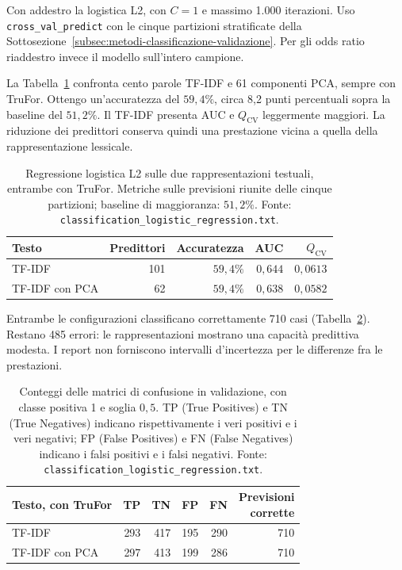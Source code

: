 Con  addestro la logistica L2, con $C=1$ e massimo 1.000 iterazioni. Uso \texttt{cross\_val\_predict} con le cinque partizioni stratificate della Sottosezione~\ref{subsec:metodi-classificazione-validazione}. Per gli odds ratio riaddestro invece il modello sull'intero campione.

La Tabella~\ref{tab:risultati-classificazione-logistica} confronta cento parole TF-IDF e 61 componenti PCA, sempre con TruFor. Ottengo un'accuratezza del $59{,}4\%$, circa 8,2 punti percentuali sopra la baseline del $51{,}2\%$. Il TF-IDF presenta AUC e $Q_{\mathrm{CV}}$ leggermente maggiori. La riduzione dei predittori conserva quindi una prestazione vicina a quella della rappresentazione lessicale.

\begin{table}[htbp]
    \centering
    \small
    \caption{Regressione logistica L2 sulle due rappresentazioni testuali, entrambe con TruFor. Metriche sulle previsioni riunite delle cinque partizioni; baseline di maggioranza: $51{,}2\%$. Fonte: \texttt{classification\_logistic\_regression.txt}.}
    \label{tab:risultati-classificazione-logistica}
    \begin{tabular}{@{}lrrrr@{}}
        \toprule
        Testo & Predittori & Accuratezza & AUC & $Q_{\mathrm{CV}}$ \\
        \midrule
        TF-IDF & 101 & $59{,}4\%$ & $0{,}644$ & $0{,}0613$ \\
        TF-IDF con PCA & 62 & $59{,}4\%$ & $0{,}638$ & $0{,}0582$ \\
        \bottomrule
    \end{tabular}
\end{table}

Entrambe le configurazioni classificano correttamente 710 casi (Tabella~\ref{tab:associazione-confusioni}). Restano 485 errori: le rappresentazioni mostrano una capacità predittiva modesta. I report non forniscono intervalli d'incertezza per le differenze fra le prestazioni.

\begin{table}[htbp]
    \centering\small
    \caption{Conteggi delle matrici di confusione in validazione, con classe positiva 1 e soglia $0{,}5$. TP (True Positives) e TN (True Negatives) indicano rispettivamente i veri positivi e i veri negativi; FP (False Positives) e FN (False Negatives) indicano i falsi positivi e i falsi negativi. Fonte: \texttt{classification\_logistic\_regression.txt}.}
    \label{tab:associazione-confusioni}
    \begin{tabular}{@{}lrrrrr@{}}
        \toprule
        Testo, con TruFor & TP & TN & FP & FN & \shortstack{Previsioni\\corrette} \\
        \midrule
        TF-IDF & 293 & 417 & 195 & 290 & 710 \\
        TF-IDF con PCA & 297 & 413 & 199 & 286 & 710 \\
        \bottomrule
    \end{tabular}
\end{table}

